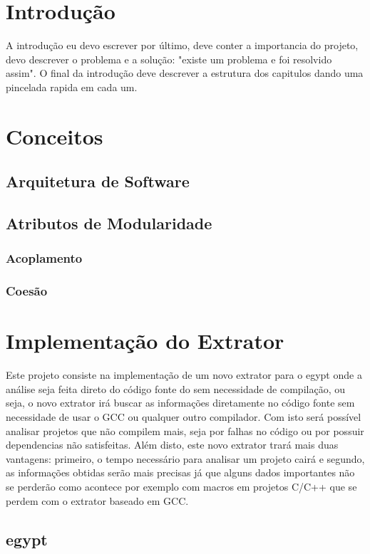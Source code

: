 \chapter{Introdução}

A introdução eu devo escrever por último, deve conter a importancia do projeto,
devo descrever o problema e a solução: "existe um problema e foi resolvido
assim". O final da introdução deve descrever a estrutura dos capitulos dando
uma pincelada rapida em cada um.

\chapter{Conceitos}
\section{Arquitetura de Software}
\section{Atributos de Modularidade}
\subsection{Acoplamento}
\subsection{Coesão}

\chapter{Implementação do Extrator}

Este projeto consiste na implementação de um novo extrator para o egypt onde a
análise seja feita direto do código fonte do sem necessidade de compilação, ou
seja, o novo extrator irá buscar as informações diretamente no código fonte sem
necessidade de usar o GCC ou qualquer outro compilador. Com isto será possível
analisar projetos que não compilem mais, seja por falhas no código ou por
possuir dependencias não satisfeitas. Além disto, este novo extrator trará mais
duas vantagens: primeiro, o tempo necessário para analisar um projeto cairá e
segundo, as informações obtidas serão mais precisas já que alguns dados
importantes não se perderão como acontece por exemplo com macros em projetos
C/C++ \cite{SourceVersusObjectCodeExtraction} que se perdem com o extrator
baseado em GCC.

\section{egypt}

